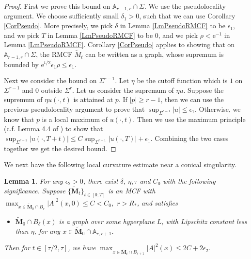 \documentclass[12pt]{amsart}
\numberwithin{equation}{section}
\newtheorem{lemma}[theorem]{Lemma}
\numberwithin{equation}{section}
\begin{document}
	\begin{proof}
		First we prove this bound on $\mathbb A_{r-1,r}\cap\Sigma$. We use the pseudolocality argument. We choose sufficiently small $\delta_1>0$, such that we can use Corollary \ref{CorPseudo}. More precisely, we pick $\delta$ in Lemma \ref{LmPseudoRMCF} to be $\epsilon_1$, and we pick $T$ in Lemma \ref{LmPseudoRMCF} to be $0$, and we pick $\rho<\mathrm{e}^{-1}$ in Lemma \ref{LmPseudoRMCF}. Corollary \ref{CorPseudo} applies to showing that on $\mathbb A_{r-1,r}\cap\Sigma$, the RMCF $\widetilde M_t$ can be written as a graph, whose supremum is bounded by $\mathrm{e}^{t/2} \epsilon_1 \rho  \leq \epsilon_1$.
		
		Next we consider the bound on $\Sigma^{r-1}$. Let $\eta$ be the cutoff function which is $1$ on $\Sigma^{r-1}$ and $0$ outside $\Sigma^{r}$. Let us consider the supremum of $\eta u$. Suppose the supremum of $\eta u(\cdot,t)$ is attained at $p$. If $|p|\geq r-1$, then we can use the previous pseudolocality argument to prove that $\sup_{\Sigma^{r-1}}|u|\leq \epsilon_1$. Otherwise, we know that $p$ is a local maximum of $u(\cdot,t)$. Then we use the maximum principle (c.f. Lemma 4.4 of \cite{CM3}) to show that $\sup_{\Sigma^{r-1}}|u(\cdot,T+t)|\leq C\sup_{\Sigma^{r-1}}|u(\cdot,T)|+\epsilon_1$. Combining the two cases together we get the desired bound. 
	\end{proof}
	
	We next have the following local curvature estimate near a conical singularity. 
	
	\begin{lemma}\label{Lem:CurEst}
		For any $\epsilon_2>0$, there exist $\delta$, $\eta,\tau$ and $C_0$ with the following significance. Suppose $\{\mathbf {\widetilde M}_t\}_{t\in[0,T]}$ is an MCF with $\max_{x\in \mathbf {\widetilde M}_0\cap B_{r}}|A|^2(x,0)\leq C<C_0$,\ $r>R_*$, and  satisfies  
		\begin{itemize}
			\item  $\mathbf {\widetilde M}_0\cap B_\delta(x)$ is a graph over some hyperplane $L$, with Lipschitz constant less than $\eta$, for any $x\in \mathbf {\widetilde M}_0\cap \mathbb A_{r,r+1}$.
		\end{itemize}
		Then for $t\in[\tau/2,\tau]$, we have
		$\max_{x\in \mathbf {\widetilde M}_t\cap B_{r+1}}|A|^2(x)\leq 2C+2\epsilon_2.$
	\end{lemma}
	
\end{document}
